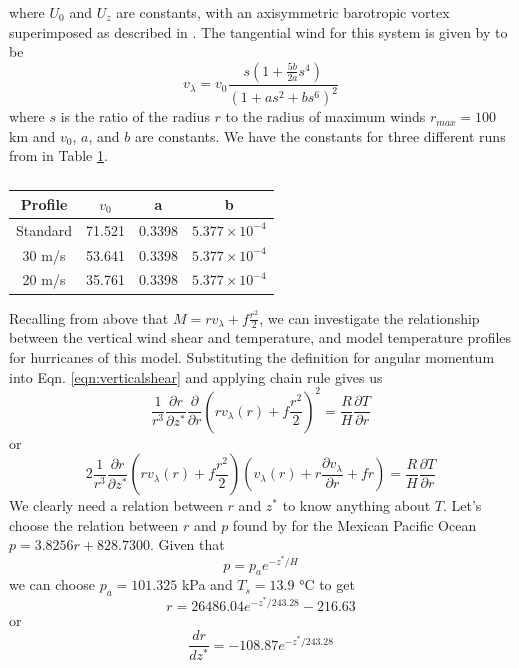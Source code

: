 where $U_0$ and $U_z$ are constants, with an axisymmetric barotropic vortex superimposed as described in \cite{Jones1995}. The tangential wind for this system is given by \cite{Jones1995} to be
\begin{equation}
    v_{\lambda} = v_0\frac{s(1+\frac{5b}{2a}s^4)}{(1+as^2+bs^6)^2}
\end{equation}
where $s$ is the ratio of the radius $r$ to the radius of maximum winds $r_{max}=100$ km and $v_0$, $a$, and $b$ are constants. We have the constants for three different runs from \cite{Jones1995} in Table \ref{tab:constants}.

\begin{table}[]
    \centering
    \begin{tabular}{|c|c|c|c|}
    \hline
         Profile&$v_0$&a&b  \\
         \hline
         Standard&71.521&0.3398&$5.377\times10^{-4}$ \\ 
         \hline
         30 m/s &53.641&0.3398&$5.377\times10^{-4}$ \\ 
         \hline
         20 m/s &35.761&0.3398&$5.377\times10^{-4}$ \\ 
         \hline
    \end{tabular}
    \caption{}
    \label{tab:constants}
\end{table}

Recalling from above that $M=rv_{\lambda}+f\frac{r^2}{2}$, we can investigate the relationship between the vertical wind shear and temperature, and model temperature profiles for hurricanes of this model. Substituting the definition for angular momentum into Eqn. \ref{eqn:verticalshear} and applying chain rule gives us 
\begin{equation}
    \frac{1}{r^3}\frac{\partial r}{\partial z^*}\frac{\partial }{\partial r}(rv_{\lambda}(r)+f\frac{r^2}{2})^2=\frac{R}{H}\frac{\partial T}{\partial r}
\end{equation}
or
\begin{equation}
    2\frac{1}{r^3}\frac{\partial r}{\partial z^*}(rv_{\lambda}(r)+f\frac{r^2}{2})(v_{\lambda}(r)+r\frac{\partial v_{\lambda}}{\partial r}+fr)=\frac{R}{H}\frac{\partial T}{\partial r}
\end{equation}
We clearly need a relation between $r$ and $z^*$ to know anything about $T$. Let's choose the relation between $r$ and $p$ found by \cite{Silvia2001} for the Mexican Pacific Ocean $p=3.8256r+828.7300$. Given that
\begin{equation*}
    p=p_a e^{-z^*/H}
\end{equation*}
we can choose $p_a=101.325 $ kPa and $T_s=13.9$ °C to get
\begin{equation*}
    r=26486.04e^{-z^*/243.28}-216.63
\end{equation*}
or
\begin{equation*}
    \frac{dr}{dz^*}=-108.87e^{-z^*/243.28}
\end{equation*}

